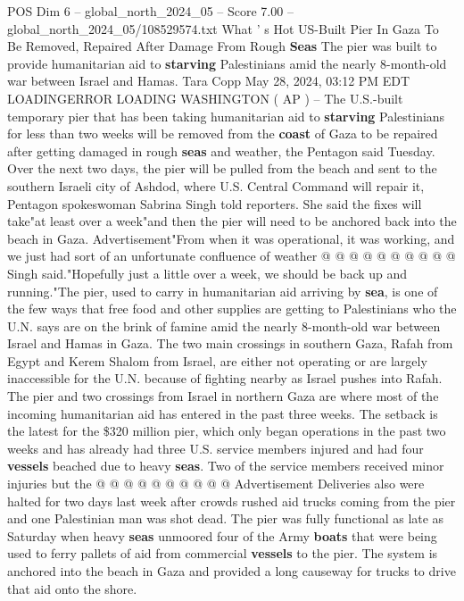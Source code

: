 \begin{textsample}{POS Dim 6 – global\_north\_2024\_05 – Score 7.00 – global\_north\_2024\_05/108529574.txt}  \label{ex:f6_pos_167}
What ' s Hot US-Built Pier In Gaza To Be Removed, Repaired After Damage From Rough \textbf{Seas} The pier was built to provide humanitarian aid to \textbf{starving} Palestinians amid the nearly 8-month-old war between Israel and Hamas.
Tara Copp May 28, 2024, 03:12 PM EDT LOADINGERROR LOADING WASHINGTON ( AP ) -- The U.S.-built temporary pier that has been taking humanitarian aid to \textbf{starving} Palestinians for less than two weeks will be removed from the \textbf{coast} of Gaza to be repaired after getting damaged in rough \textbf{seas} and weather, the Pentagon said Tuesday.
Over the next two days, the pier will be pulled from the beach and sent to the southern Israeli city of Ashdod, where U.S.
Central Command will repair it, Pentagon spokeswoman Sabrina Singh told reporters.
She said the fixes will take"at least over a week"and then the pier will need to be anchored back into the beach in Gaza.
Advertisement"From when it was operational, it was working, and we just had sort of an unfortunate confluence of weather @ @ @ @ @ @ @ @ @ @ Singh said."Hopefully just a little over a week, we should be back up and running."The pier, used to carry in humanitarian aid arriving by \textbf{sea}, is one of the few ways that free food and other supplies are getting to Palestinians who the U.N. says are on the brink of famine amid the nearly 8-month-old war between Israel and Hamas in Gaza.
The two main crossings in southern Gaza, Rafah from Egypt and Kerem Shalom from Israel, are either not operating or are largely inaccessible for the U.N. because of fighting nearby as Israel pushes into Rafah.
The pier and two crossings from Israel in northern Gaza are where most of the incoming humanitarian aid has entered in the past three weeks.
The setback is the latest for the \$320 million pier, which only began operations in the past two weeks and has already had three U.S. service members injured and had four \textbf{vessels} beached due to heavy \textbf{seas}.
Two of the service members received minor injuries but the @ @ @ @ @ @ @ @ @ @ Advertisement Deliveries also were halted for two days last week after crowds rushed aid trucks coming from the pier and one Palestinian man was shot dead.
The pier was fully functional as late as Saturday when heavy \textbf{seas} unmoored four of the Army \textbf{boats} that were being used to ferry pallets of aid from commercial \textbf{vessels} to the pier.
The system is anchored into the beach in Gaza and provided a long causeway for trucks to drive that aid onto the shore.

\end{textsample}
